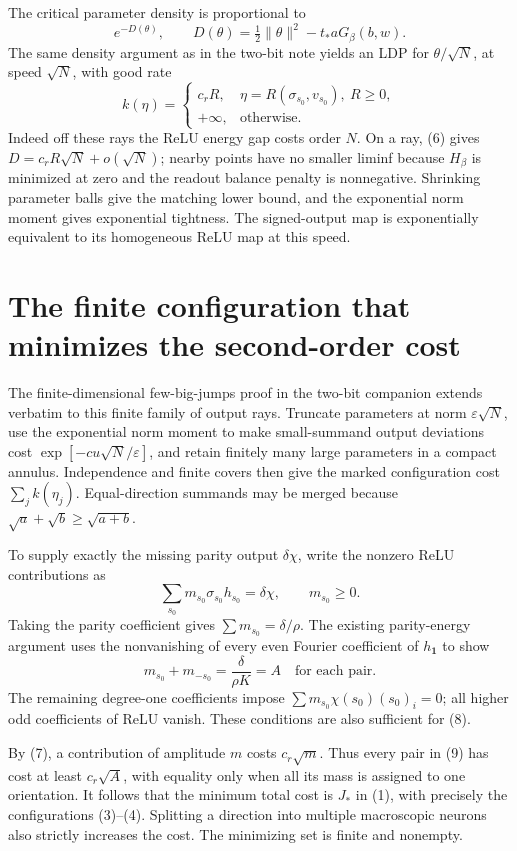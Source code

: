\documentclass[11pt]{article}
\newcommand{\one}{\mathbf1}\newcommand{\relu}{\operatorname{ReLU}}
\begin{document}
The critical parameter density is proportional to
\[
 e^{-D(\theta)},\qquad
 D(\theta)=\tfrac12\|\theta\|^2-t_*aG_\beta(b,w).
\]
The same density argument as in the two-bit note yields an LDP for
$\theta/\sqrt N$, at speed $\sqrt N$, with good rate
\[
 k(\eta)=
 \begin{cases}
 c_r R,&\eta=R(\sigma_{s_0},v_{s_0}),\ R\ge0,\\
 +\infty,&\text{otherwise}.
 \end{cases}                                                \tag{7}
\]
Indeed off these rays the ReLU energy gap costs order $N$. On a ray,
(6) gives $D=c_rR\sqrt N+o(\sqrt N)$; nearby points have no smaller
liminf because $H_\beta$ is minimized at zero and the readout balance
penalty is nonnegative. Shrinking parameter balls give the matching
lower bound, and the exponential norm moment gives exponential
tightness. The signed-output map is exponentially equivalent to its
homogeneous ReLU map at this speed.

\section{The finite configuration that minimizes the second-order cost}
The finite-dimensional few-big-jumps proof in the two-bit companion
extends verbatim to this finite family of output rays. Truncate
parameters at norm $\varepsilon\sqrt N$, use the exponential norm
moment to make small-summand output deviations cost
$\exp[-cu\sqrt N/\varepsilon]$, and retain finitely many large
parameters in a compact annulus. Independence and finite covers then
give the marked configuration cost $\sum_j k(\eta_j)$.
Equal-direction summands may be merged because
$\sqrt a+\sqrt b\ge\sqrt{a+b}$.

To supply exactly the missing parity output $\delta\chi$, write
the nonzero ReLU contributions as
\[
 \sum_{s_0} m_{s_0}\sigma_{s_0}h_{s_0}=\delta\chi,
 \qquad m_{s_0}\ge0.                                      \tag{8}
\]
Taking the parity coefficient gives $\sum m_{s_0}=\delta/\rho$.
The existing parity-energy argument uses the nonvanishing of every
even Fourier coefficient of $h_{\one}$ to show
\[
 m_{s_0}+m_{-s_0}=\frac{\delta}{\rho K}=A
                    \quad\text{for each pair}.             \tag{9}
\]
The remaining degree-one coefficients impose
$\sum m_{s_0}\chi(s_0)(s_0)_i=0$; all higher odd coefficients of
ReLU vanish. These conditions are also sufficient for (8).

By (7), a contribution of amplitude $m$ costs $c_r\sqrt m$.
Thus every pair in (9) has cost at least $c_r\sqrt A$, with equality
only when all its mass is assigned to one orientation. It follows that
the minimum total cost is $J_*$ in (1), with precisely the configurations
(3)--(4). Splitting a direction into multiple macroscopic neurons also
strictly increases the cost. The minimizing set is finite and nonempty.
\end{document}
